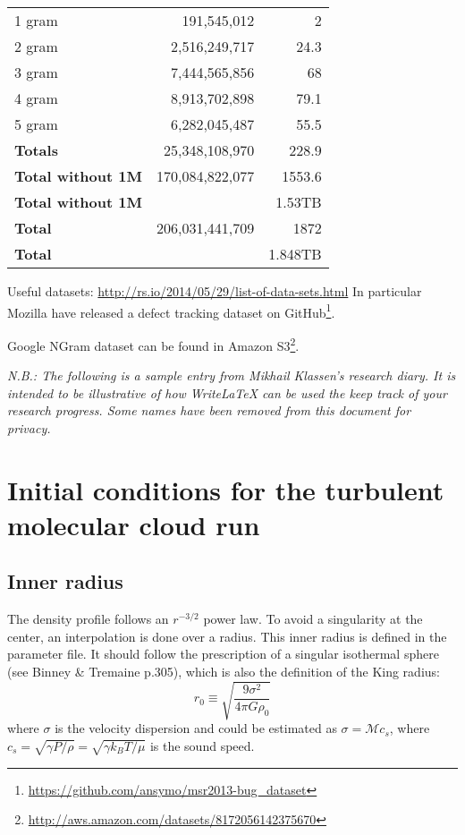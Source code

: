 \documentclass[a4paper]{tufte-handout}
\begin{document}
\begin{table}[p]
\begin{tabular}{lrr}
    1 gram	&	191,545,012	&	2\\
    2 gram	&	2,516,249,717	&	24.3\\
    3 gram	&	7,444,565,856	&	68\\
    4 gram	&	8,913,702,898	&	79.1\\
    5 gram	&	6,282,045,487	&	55.5\\
    \textbf{Totals}	& 25,348,108,970	&	228.9\\
    \midrule
    \textbf{Total without 1M}  &	170,084,822,077 &	1553.6\\
    \textbf{Total without 1M} &  &	1.53TB\\
    \textbf{Total}	& 206,031,441,709 &	1872\\
    \textbf{Total}	& &	1.848TB\\
  \end{tabular}
\end{table}


\hrulefill



Useful datasets: \url{http://rs.io/2014/05/29/list-of-data-sets.html} In particular Mozilla have released a defect tracking dataset on GitHub\footnote{\url{https://github.com/ansymo/msr2013-bug_dataset}}\citep{Lamkanfi+13}.

Google NGram dataset can be found in Amazon S3\footnote{\url{http://aws.amazon.com/datasets/8172056142375670}}.

\hrulefill



\textit{N.B.: The following is a sample entry from Mikhail Klassen's research diary. It is intended to be illustrative of how WriteLaTeX can be used the keep track of your research progress. Some names have been removed from this document for privacy.}

\section*{Initial conditions for the turbulent molecular cloud run}

\subsection*{Inner radius}

The density profile follows an $r^{-3/2}$ power law. To avoid a singularity at the center, an interpolation is done over a radius. This inner radius is defined in the parameter file. It should follow the prescription of a singular isothermal sphere (see Binney \& Tremaine p.305), which is also the definition of the King radius:
\begin{equation}
  r_0 \equiv \sqrt{\frac{9\sigma^2}{4\pi G\rho_0}}
\end{equation}
where $\sigma$ is the velocity dispersion and could be estimated as $\sigma = \mathcal{M} c_s$, where $c_s = \sqrt{\gamma P/\rho} = \sqrt{\gamma k_B T / \mu}$ is the sound speed.
\end{document}
